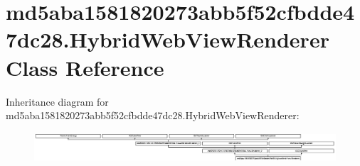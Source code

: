 \hypertarget{classmd5aba1581820273abb5f52cfbdde47dc28_1_1HybridWebViewRenderer}{}\section{md5aba1581820273abb5f52cfbdde47dc28.\+Hybrid\+Web\+View\+Renderer Class Reference}
\label{classmd5aba1581820273abb5f52cfbdde47dc28_1_1HybridWebViewRenderer}
Inheritance diagram for md5aba1581820273abb5f52cfbdde47dc28.\+Hybrid\+Web\+View\+Renderer\+:\begin{figure}[H]
\begin{center}
\leavevmode
\includegraphics[height=1.095355cm]{classmd5aba1581820273abb5f52cfbdde47dc28_1_1HybridWebViewRenderer}
\end{center}
\end{figure}
